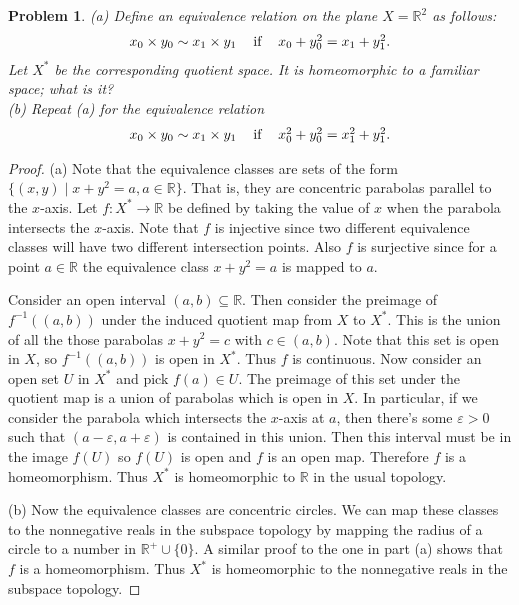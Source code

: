 \documentclass{article}
\newtheorem{problem}{Problem}
\begin{document}
\begin{problem}
(a) Define an equivalence relation on the plane $X = \mathbb{R}^2$ as follows:
\[
\begin{tabular}{ccc}
$x_0 \times y_0 \sim x_1 \times y_1$ & if & $x_0 + y_0^2 = x_1 + y_1^2$.
\end{tabular}
\]
Let $X^*$ be the corresponding quotient space. It is homeomorphic to a familiar space; what is it?\\
(b) Repeat (a) for the equivalence relation
\[
\begin{tabular}{ccc}
$x_0 \times y_0 \sim x_1 \times y_1$ & if & $x_0^2 + y_0^2 = x_1^2 + y_1^2$.
\end{tabular}
\]
\end{problem}
\begin{proof}
(a) Note that the equivalence classes are sets of the form $\{(x,y) \mid x + y^2 = a, a \in \mathbb{R}\}$. That is, they are concentric parabolas parallel to the $x$-axis. Let $f : X^* \to \mathbb{R}$ be defined by taking the value of $x$ when the parabola intersects the $x$-axis. Note that $f$ is injective since two different equivalence classes will have two different intersection points. Also $f$ is surjective since for a point $a \in \mathbb{R}$ the equivalence class $x + y^2 = a$ is mapped to $a$.

Consider an open interval $(a,b) \subseteq \mathbb{R}$. Then consider the preimage of $f^{-1}((a,b))$ under the induced quotient map from $X$ to $X^*$. This is the union of all the those parabolas $x + y^2 = c$ with $c \in (a,b)$. Note that this set is open in $X$, so $f^{-1}((a,b))$ is open in $X^*$. Thus $f$ is continuous. Now consider an open set $U$ in $X^*$ and pick $f(a) \in U$. The preimage of this set under the quotient map is a union of parabolas which is open in $X$. In particular, if we consider the parabola which intersects the $x$-axis at $a$, then there's some $\varepsilon > 0$ such that $(a - \varepsilon, a + \varepsilon)$ is contained in this union. Then this interval must be in the image $f(U)$ so $f(U)$ is open and $f$ is an open map. Therefore $f$ is a homeomorphism. Thus $X^*$ is homeomorphic to $\mathbb{R}$ in the usual topology.

(b) Now the equivalence classes are concentric circles. We can map these classes to the nonnegative reals in the subspace topology by mapping the radius of a circle to a number in $\mathbb{R}^+ \cup \{0\}$. A similar proof to the one in part (a) shows that $f$ is a homeomorphism. Thus $X^*$ is homeomorphic to the nonnegative reals in the subspace topology.
\end{proof}
\end{document}
